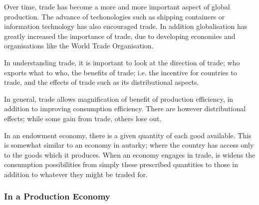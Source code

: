 \documentclass[12pt]{report}
\begin{document}
\begin{flushleft}
Over time, trade has become a more and more important aspect of global
production. The advance of techonologies such as shipping containers or
information technology has also encouraged trade. In addition globalisation
has greatly increased the importance of trade, due to developing economies and
organisations like the World Trade Organisation. \par
In understanding trade, it is important to look at the direction of trade; who
exports what to who, the benefits of trade; i.e. the incentive for countries to
trade, and the effects of trade such as its distributional aspects. \par
In general, trade allows magnification of benefit of production efficiency, in
addition to improving consumption efficiency. There are however distributional
effects; while some gain from trade, others lose out. \par
In an endowment economy, there is a given quantity of each good available. This
is somewhat similar to an economy in autarky; where the country has access only
to the goods which it produces. When an economy engages in trade, is widens the
consumption possibilities from simply these prescribed quantities to those in
addition to whatever they might be traded for.

\subsubsection*{In a Production Economy}


\end{flushleft}
\end{document}
